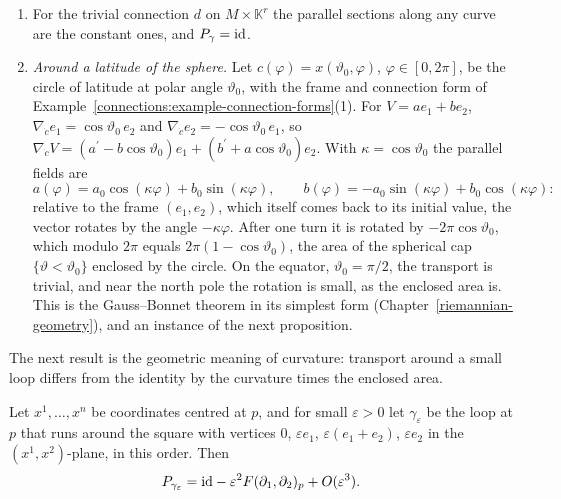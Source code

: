 \begin{example}\label{connections:example-transport}
\begin{enumerate}
\item For the trivial connection $d$ on $M \times \mathbb{K}^r$ the parallel sections along any curve are the constant ones, and $P_\gamma = \mathrm{id}$.
\item \emph{Around a latitude of the sphere.} Let $c(\varphi) = x(\vartheta_0, \varphi)$, $\varphi \in [0, 2\pi]$, be the circle of latitude at polar angle $\vartheta_0$, with the frame
and connection form of Example~\ref{connections:example-connection-forms}(1). For $V = ae_1 + be_2$, $\nabla_{\dot c}e_1 = \cos\vartheta_0\,e_2$ and
$\nabla_{\dot c}e_2 = -\cos\vartheta_0\,e_1$, so $\nabla_{\dot c}V = (a^{\prime} - b\cos\vartheta_0)e_1 + (b^{\prime} + a\cos\vartheta_0)e_2$. With $\kappa = \cos\vartheta_0$ the parallel
fields are
\[
a(\varphi) = a_0\cos(\kappa\varphi) + b_0\sin(\kappa\varphi), \qquad b(\varphi) = -a_0\sin(\kappa\varphi) + b_0\cos(\kappa\varphi):
\]
relative to the frame $(e_1, e_2)$, which itself comes back to its initial value, the vector rotates by the angle $-\kappa\varphi$. After one turn it is rotated by
$-2\pi\cos\vartheta_0$, which modulo $2\pi$ equals $2\pi(1 - \cos\vartheta_0)$, the area of the spherical cap $\{\vartheta < \vartheta_0\}$ enclosed by the circle. On the equator,
$\vartheta_0 = \pi/2$, the transport is trivial, and near the north pole the rotation is small, as the enclosed area is. This is the Gauss--Bonnet theorem in its simplest form
(Chapter~\ref{riemannian-geometry}), and an instance of the next proposition.
\end{enumerate}
\end{example}

The next result is the geometric meaning of curvature: transport around a small loop differs from the identity by the curvature times the enclosed area.

\begin{proposition}\label{connections:proposition-small-loops}
Let $x^1, \ldots, x^n$ be coordinates centred at $p$, and for small $\varepsilon > 0$ let $\gamma_\varepsilon$ be the loop at $p$ that runs around the square with vertices $0$,
$\varepsilon e_1$, $\varepsilon(e_1 + e_2)$, $\varepsilon e_2$ in the $(x^1, x^2)$-plane, in this order. Then
\[
P_{\gamma_\varepsilon} = \mathrm{id} - \varepsilon^2F(\partial_1, \partial_2)_p + O(\varepsilon^3).
\]
\end{proposition}

